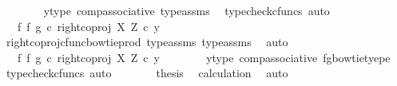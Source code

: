 \begin{isabellebody}
\ \ \ \ \ \ \isamarkupfalse%
\ y{\isacharunderscore}{\kern0pt}type{}\ comp{\isacharunderscore}{\kern0pt}associative{}\ type{\isacharunderscore}{\kern0pt}assms{\isacharparenleft}{\kern0pt}{}{\isacharparenright}{\kern0pt}\ \isamarkupfalse%
\ {\isacharparenleft}{\kern0pt}typecheck{\isacharunderscore}{\kern0pt}cfuncs{\isacharcomma}{\kern0pt}\ auto{\isacharparenright}{\kern0pt}\isanewline
\ \ \ \ \isamarkupfalse%
\ \isamarkupfalse%
\ {\isachardoublequoteopen}{\isachardot}{\kern0pt}{\isachardot}{\kern0pt}{\isachardot}{\kern0pt}\ {\isacharequal}{\kern0pt}\ {\isacharparenleft}{\kern0pt}{\isacharparenleft}{\kern0pt}f\ {\isasymbowtie}\isactrlsub f\ g{\isacharparenright}{\kern0pt}\ {\isasymcirc}\isactrlsub c\ right{\isacharunderscore}{\kern0pt}coproj\ X\ Z{\isacharparenright}{\kern0pt}\ {\isasymcirc}\isactrlsub c\ y{\isachardoublequoteclose}\isanewline
\ \ \ \ \ \ \isamarkupfalse%
\ right{\isacharunderscore}{\kern0pt}coproj{\isacharunderscore}{\kern0pt}cfunc{\isacharunderscore}{\kern0pt}bowtie{\isacharunderscore}{\kern0pt}prod\ type{\isacharunderscore}{\kern0pt}assms{\isacharparenleft}{\kern0pt}{}{\isacharparenright}{\kern0pt}\ type{\isacharunderscore}{\kern0pt}assms{\isacharparenleft}{\kern0pt}{}{\isacharparenright}{\kern0pt}\ \isamarkupfalse%
\ auto\isanewline
\ \ \ \ \isamarkupfalse%
\ \isamarkupfalse%
\ {\isachardoublequoteopen}{\isachardot}{\kern0pt}{\isachardot}{\kern0pt}{\isachardot}{\kern0pt}\ {\isacharequal}{\kern0pt}\ {\isacharparenleft}{\kern0pt}f\ {\isasymbowtie}\isactrlsub f\ g{\isacharparenright}{\kern0pt}\ {\isasymcirc}\isactrlsub c\ right{\isacharunderscore}{\kern0pt}coproj\ X\ Z\ {\isasymcirc}\isactrlsub c\ y{\isachardoublequoteclose}\isanewline
\ \ \ \ \ \ \isamarkupfalse%
\ y{\isacharunderscore}{\kern0pt}type{}\ comp{\isacharunderscore}{\kern0pt}associative{}\ fg{\isacharunderscore}{\kern0pt}bowtie{\isacharunderscore}{\kern0pt}tyepe\ \isamarkupfalse%
\ {\isacharparenleft}{\kern0pt}typecheck{\isacharunderscore}{\kern0pt}cfuncs{\isacharcomma}{\kern0pt}\ auto{\isacharparenright}{\kern0pt}\isanewline
\ \ \ \ \isamarkupfalse%
\ \isamarkupfalse%
\ {\isacharquery}{\kern0pt}thesis\ \isamarkupfalse%
\ calculation\ \isamarkupfalse%
\ auto\isanewline
\ \ \isamarkupfalse%
\isanewline
\ \ \isamarkupfalse%
\ \isamarkupfalse%

\end{isabellebody}
